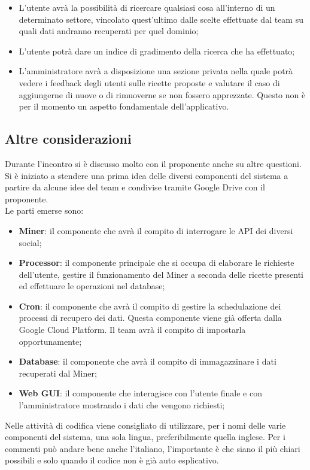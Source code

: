 \begin{itemize}
			\item L'utente avrà la possibilità di ricercare qualsiasi cosa all'interno di un determinato settore, vincolato quest'ultimo dalle scelte effettuate dal team su quali dati andranno recuperati per quel dominio;
			\item L'utente potrà dare un indice di gradimento della ricerca che ha effettuato;
			\item L'amministratore avrà a disposizione una sezione privata nella quale potrà vedere i feedback degli utenti sulle ricette proposte e valutare il caso di aggiungerne di nuove o di rimuoverne se non fossero apprezzate. Questo non è per il momento un aspetto fondamentale dell'applicativo.
		\end{itemize}

	\subsection{Altre considerazioni} %
	\label{sub:altre_considerazioni}
	Durante l'incontro si è discusso molto con il proponente anche su altre questioni. \\
	Si è iniziato a stendere una prima idea delle diversi componenti del sistema a partire da alcune idee del team e condivise tramite Google Drive con il proponente. \\
	Le parti emerse sono:
		\begin{itemize}
			\item \textbf{Miner}: il componente che avrà il compito di interrogare le API dei diversi social;
			\item \textbf{Processor}: il componente principale che si occupa di elaborare le richieste dell'utente, gestire il funzionamento del Miner a seconda delle ricette presenti ed effettuare le operazioni nel database;
			\item \textbf{Cron}: il componente che avrà il compito di gestire la schedulazione dei processi di recupero dei dati. Questa componente viene già offerta dalla Google Cloud Platform. Il team avrà il compito di impostarla opportunamente;
			\item \textbf{Database}: il componente che avrà il compito di immagazzinare i dati recuperati dal Miner;
			\item \textbf{Web GUI}: il componente che interagisce con l'utente finale e con l'amministratore mostrando i dati che vengono richiesti;
		\end{itemize}
	\noindent
	Nelle attività di codifica viene consigliato di utilizzare, per i nomi delle varie componenti del sistema, una sola lingua, preferibilmente quella inglese. Per i commenti può andare bene anche l'italiano, l'importante è che siano il più chiari possibili e solo quando il codice non è già auto esplicativo. \\

